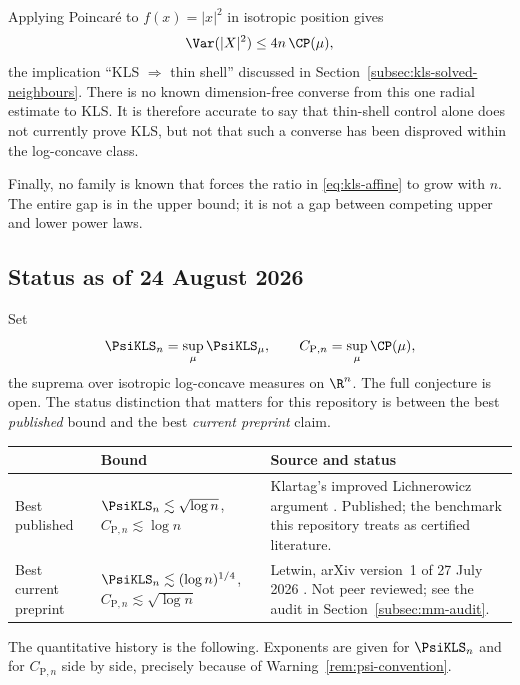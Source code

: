 \documentclass[../../main.tex]{subfiles}
\begin{document}
Applying Poincar\'e to $f(x)=|x|^2$ in isotropic position gives
\begin{equation}
  \Var(|X|^2)\le4n\,\CP(\mu),
  \label{eq:kls-implies-thin-shell}
\end{equation}
the implication ``KLS $\Rightarrow$ thin shell'' discussed in
Section~\ref{subsec:kls-solved-neighbours}. There is no known dimension-free converse from this
one radial estimate to KLS. It is therefore accurate to say that thin-shell control alone does
not currently prove KLS, but not that such a converse has been disproved within the log-concave
class.

Finally, no family is known that forces the ratio in \eqref{eq:kls-affine} to grow with $n$. The
entire gap is in the upper bound; it is not a gap between competing upper and lower power laws.

\subsection{Status as of 24 August 2026}
\label{subsec:kls-status}

Set
\[
  \PsiKLS_n=\sup_\mu\PsiKLS_\mu,
  \qquad
  C_{\mathrm P,n}=\sup_\mu\CP(\mu),
\]
the suprema over isotropic log-concave measures on $\R^n$. The full conjecture is open. The
status distinction that matters for this repository is between the best \emph{published} bound
and the best \emph{current preprint} claim.

\begin{center}
\begin{tabularx}{\textwidth}{@{}>{\raggedright\arraybackslash}p{}>{\raggedright\arraybackslash}p{}Y@{}}
\toprule
& Bound & Source and status \\
\midrule
Best published & $\PsiKLS_n\lesssim\sqrt{\log n}$, \quad $C_{\mathrm P,n}\lesssim\log n$
& Klartag's improved Lichnerowicz argument \cite{Klartag2023Logarithmic}. Published; the
benchmark this repository treats as certified literature. \\
\addlinespace
Best current preprint & $\PsiKLS_n\lesssim(\log n)^{1/4}$, \quad $C_{\mathrm P,n}\lesssim\sqrt{\log n}$
& Letwin, arXiv version~1 of 27 July 2026 \cite{Letwin2026QuadraticKLS}. Not peer reviewed; see
the audit in Section~\ref{subsec:mm-audit}. \\
\bottomrule
\end{tabularx}
\end{center}

The quantitative history is the following. Exponents are given for $\PsiKLS_n$ and for
$C_{\mathrm P,n}$ side by side, precisely because of Warning~\ref{rem:psi-convention}.
\end{document}
